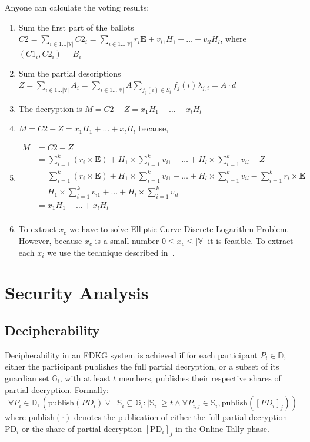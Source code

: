 \documentclass{article}
\begin{document}
Anyone can calculate the voting results:
\begin{enumerate}
    \item Sum the first part of the ballots $C2 = \sum_{i \in 1 \dots |\mathbb{V}|} C2_i = \sum_{i \in 1 \dots |\mathbb{V}|} r_i \mathbf{E} + v_{i1} H_1 + \dots + v_{il} H_l$, where $(C1_i,C2_i)=B_i$
    \item Sum the partial descriptions $Z=\sum_{i \in 1 \dots |\mathbb{V}|} A_i = \sum_{i \in 1 \dots |\mathbb{V}|} A \sum_{f_j(i) \in S_i} f_j(i) \lambda_{j,i} = A \cdot d$
    \item The decryption is $M=C2-Z=x_1 H_1 + \dots + x_l H_l$
    \item $M=C2-Z=x_1 H_1 + \dots + x_l H_l$ because,
    \item $\begin{aligned} M&=C2-Z \\
        &= \sum_{i=1}^k ( r_{i} \times \mathbf{E}) + H_1 \times \sum_{i=1}^k v_{i1} + \dots + H_l \times \sum_{i=1}^k v_{il} - Z\\
        &= \sum_{i=1}^k ( r_{i} \times \mathbf{E}) + H_1 \times \sum_{i=1}^k v_{i1} + \dots + H_l \times \sum_{i=1}^k v_{il} - \sum_{i=1}^k r_{i} \times \mathbf{E}\\
        &= H_1 \times \sum_{i=1}^k v_{i1} + \dots + H_l \times \sum_{i=1}^k v_{il}\\
        &= x_1 H_1 + \dots + x_l H_l\\
        \end{aligned}$
    \item To extract $x_c$ we have to solve Elliptic-Curve Discrete Logarithm Problem. However, because $x_c$ is a small number $0 \leq x_c \leq |\mathbb{V}|$ it is feasible. To extract each $x_i$ we use the technique described in~\cite{haoAnonymousVotingTworound2010}.
\end{enumerate}

\section{Security Analysis}


\subsection*{Decipherability}

\begin{definition}[Decipherability] \label{def:decipherability}
    Decipherability in an FDKG system is achieved if for each participant $P_i \in \mathbb{D}$, either the participant publishes the full partial decryption, or a subset of its guardian set $\mathbb{G}_i$, with at least $t$ members, publishes their respective shares of partial decryption. Formally: 
    \[
    \forall P_i \in \mathbb{D}, \left( \textrm{publish}(PD_i) \lor \exists \mathbb{S}_i \subseteq \mathbb{G}_i : |\mathbb{S}_i| \geq t \land \forall P_{i,j} \in \mathbb{S}_i, \textrm{publish}([PD_i]_j) \right)
    \]
    where \(\textrm{publish}(\cdot)\) denotes the publication of either the full partial decryption $\textrm{PD}_i$ or the share of partial decryption $[\textrm{PD}_i]_j$ in the Online Tally phase.
\end{definition}
\end{document}
